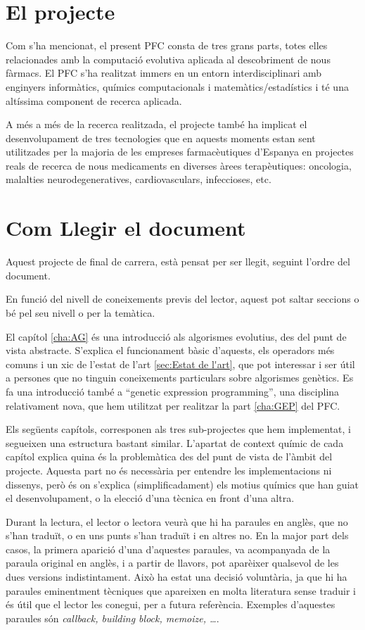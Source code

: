 \section{El projecte}

Com s'ha mencionat, el present PFC consta de tres grans
parts, totes elles relacionades amb la computació evolutiva aplicada al
descobriment de nous fàrmacs. El PFC s'ha realitzat immers en un entorn
interdisciplinari amb enginyers informàtics, químics computacionals i
matemàtics/estadístics i té una altíssima component de recerca aplicada. 

A més a més de la recerca realitzada, el projecte també ha implicat el
desenvolupament de tres tecnologies que en aquests moments estan sent
utilitzades per la majoria de les empreses farmacèutiques d'Espanya en projectes
reals de recerca de nous medicaments en diverses àrees terapèutiques: oncologia,
malalties neurodegeneratives, cardiovasculars, infeccioses, etc.

\section{Com Llegir el document} %
\label{sec:Com Llegir el document}

Aquest projecte de final de carrera, està pensat per ser llegit, seguint l'ordre
del document.

En funció del nivell de coneixements previs del lector, aquest pot saltar
seccions o bé pel seu nivell o per la temàtica.

El capítol \ref{cha:AG} és una introducció als algorismes evolutius, des del
punt de vista abstracte.  S'explica el funcionament bàsic d'aquests, els
operadors més comuns i un xic de l'estat de l'art \ref{sec:Estat de l'art}, que
pot interessar i ser útil a persones que no tinguin coneixements particulars
sobre algorismes genètics.  Es fa una introducció també a ``genetic expression
programming'', una disciplina relativament nova, que hem utilitzat per realitzar
la part \ref{cha:GEP} del PFC.

Els següents capítols, corresponen als tres sub-projectes que hem implementat, i
segueixen una estructura bastant similar.  L'apartat de context químic de cada
capítol explica quina és la problemàtica des del punt de vista de l'àmbit del
projecte.  Aquesta part no és necessària per entendre les implementacions ni
dissenys, però és on s'explica (simplificadament) els motius químics que han
guiat el desenvolupament, o la elecció d'una tècnica en front d'una altra.

Durant la lectura, el lector o lectora veurà que hi ha paraules en anglès, que
no s'han traduït, o en uns punts s'han traduït i en altres no.  En la major part
dels casos, la primera aparició d'una d'aquestes paraules, va acompanyada de la
paraula original en anglès, i a partir de llavors, pot aparèixer qualsevol de
les dues versions indistintament.  Això ha estat una decisió voluntària, ja que
hi ha paraules eminentment tècniques que apareixen en molta literatura sense
traduir i és útil que el lector les conegui, per a futura referència.  Exemples
d'aquestes paraules són \emph{callback, building block, memoize, \ldots}.


